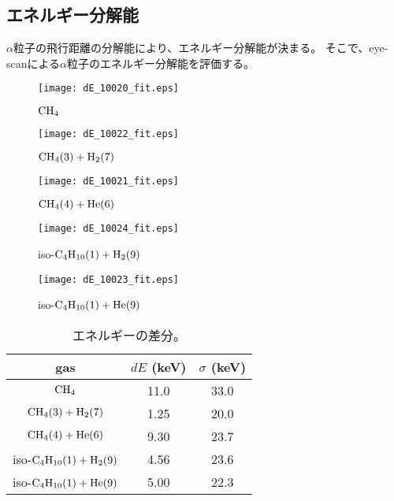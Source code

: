 \documentclass[../master]{subfiles}
\begin{document}
\subsection{エネルギー分解能}
$\alpha$粒子の飛行距離の分解能により、エネルギー分解能が決まる。
そこで、eye-scanによる$\alpha$粒子のエネルギー分解能を評価する。
\begin{figure}
  \centering
  \begin{minipage}{0.45\columnwidth}
    \centering
    \texttt{[image: dE\_10020\_fit.eps]}
    \caption{$\rm CH_{4}$}
    \label{fig::dE_ch4}
  \end{minipage}
\end{figure}
\begin{figure}
  \begin{minipage}{0.45\columnwidth}
    \centering
    \texttt{[image: dE\_10022\_fit.eps]}
    \caption{$\rm CH_{4} (3) + H_{2} (7)$}
    \label{fig::dE_ch4_h2}
  \end{minipage}
  \centering
  \begin{minipage}{0.45\columnwidth}
    \centering
    \texttt{[image: dE\_10021\_fit.eps]}
    \caption{$\rm CH_{4} (4) + He(6)$}
    \label{fig::dE_ch4_he}
  \end{minipage}
\end{figure}
\begin{figure}
  \begin{minipage}{0.45\columnwidth}
    \centering
    \texttt{[image: dE\_10024\_fit.eps]}
    \caption{iso-$\rm C_{4}H_{10} (1) + H_{2} (9)$}
    \label{fig::dE_ic4h10_h2}
  \end{minipage}
  \centering
  \begin{minipage}{0.45\columnwidth}
    \centering
    \texttt{[image: dE\_10023\_fit.eps]}
    \caption{iso-$\rm C_{4}H_{10} (1) + He (9)$}
    \label{fig::dE_ic4h10_he}
  \end{minipage}
\end{figure}
\begin{table}
  \centering
  \caption{エネルギーの差分。}
  \label{tab::energy_resolution}
  \begin{tabular}{ccc}
    \toprule
    gas & $dE$ (keV) & $\sigma$ (keV) \\
    \midrule
    $\rm CH_{4}$ & 11.0 & 33.0  \\
    $\rm CH_{4} (3) + H_{2} (7)$ & 1.25 & 20.0 \\
    $\rm CH_{4} (4) + He (6)$ & 9.30 & 23.7 \\
    iso-$\rm C_{4}H_{10} (1) + H_{2} (9)$ & 4.56 & 23.6 \\
    iso-$\rm C_{4}H_{10} (1) + He (9)$ & 5.00 & 22.3 \\
    \bottomrule
  \end{tabular}
\end{table}
\end{document}
